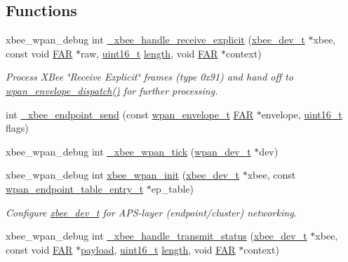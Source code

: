 \subsection*{Functions}
\begin{DoxyCompactItemize}
\item 
xbee\-\_\-wpan\-\_\-debug int \hyperlink{group__xbee__wpan_ga8cb1973677412a2c5627a77009a8f283}{\-\_\-xbee\-\_\-handle\-\_\-receive\-\_\-explicit} (\hyperlink{structxbee__dev__t}{xbee\-\_\-dev\-\_\-t} $\ast$xbee, const void \hyperlink{group__hal_gaef060b3456fdcc093a7210a762d5f2ed}{F\-A\-R} $\ast$raw, \hyperlink{group__hal_ga5a8b2dc9e45a9ee81a94ef304fb62505}{uint16\-\_\-t} \hyperlink{group__zdo_gab2b3adeb2a67e656ff030b56727fd0ac}{length}, void \hyperlink{group__hal_gaef060b3456fdcc093a7210a762d5f2ed}{F\-A\-R} $\ast$context)
\begin{DoxyCompactList}\small\item\em Process X\-Bee \char`\"{}\-Receive Explicit\char`\"{} frames (type 0x91) and hand off to \hyperlink{group__wpan__aps_gae84eafd10f51de6cdac4732b8948606d}{wpan\-\_\-envelope\-\_\-dispatch()} for further processing. \end{DoxyCompactList}\item 
int \hyperlink{group__xbee__wpan_ga1e5f537223d8dffb4d74f48bbc43d149}{\-\_\-xbee\-\_\-endpoint\-\_\-send} (const \hyperlink{structwpan__envelope__t}{wpan\-\_\-envelope\-\_\-t} \hyperlink{group__hal_gaef060b3456fdcc093a7210a762d5f2ed}{F\-A\-R} $\ast$envelope, \hyperlink{group__hal_ga5a8b2dc9e45a9ee81a94ef304fb62505}{uint16\-\_\-t} flags)
\item 
xbee\-\_\-wpan\-\_\-debug int \hyperlink{group__xbee__wpan_ga7c0492680badfd8ee30c5d797395394f}{\-\_\-xbee\-\_\-wpan\-\_\-tick} (\hyperlink{structwpan__dev__t}{wpan\-\_\-dev\-\_\-t} $\ast$dev)
\item 
xbee\-\_\-wpan\-\_\-debug int \hyperlink{group__xbee__wpan_ga6b3d55dddb48e31d3f975f2afb4c9977}{xbee\-\_\-wpan\-\_\-init} (\hyperlink{structxbee__dev__t}{xbee\-\_\-dev\-\_\-t} $\ast$xbee, const \hyperlink{structwpan__endpoint__table__entry__t}{wpan\-\_\-endpoint\-\_\-table\-\_\-entry\-\_\-t} $\ast$ep\-\_\-table)
\begin{DoxyCompactList}\small\item\em Configure \hyperlink{structxbee__dev__t}{xbee\-\_\-dev\-\_\-t} for A\-P\-S-\/layer (endpoint/cluster) networking. \end{DoxyCompactList}\item 
xbee\-\_\-wpan\-\_\-debug int \hyperlink{group__xbee__wpan_ga56d68291ceee384fbd8a5833eb91182c}{\-\_\-xbee\-\_\-handle\-\_\-transmit\-\_\-status} (\hyperlink{structxbee__dev__t}{xbee\-\_\-dev\-\_\-t} $\ast$xbee, const void \hyperlink{group__hal_gaef060b3456fdcc093a7210a762d5f2ed}{F\-A\-R} $\ast$\hyperlink{group__zcl_gacb1403989580c30b5cac60f347c5d6ab}{payload}, \hyperlink{group__hal_ga5a8b2dc9e45a9ee81a94ef304fb62505}{uint16\-\_\-t} \hyperlink{group__zdo_gab2b3adeb2a67e656ff030b56727fd0ac}{length}, void \hyperlink{group__hal_gaef060b3456fdcc093a7210a762d5f2ed}{F\-A\-R} $\ast$context)
\end{DoxyCompactItemize}
